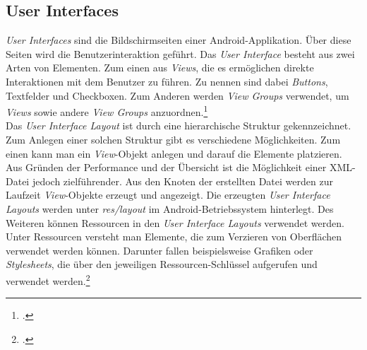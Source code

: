 \subsection{User Interfaces}
\label{ssec:android-ui}
\textit{User Interfaces} sind die Bildschirmseiten einer \gls{Android}-Applikation. Über diese Seiten wird die Benutzerinteraktion geführt. Das \textit{User Interface} besteht aus zwei Arten von Elementen. Zum einen aus \textit{Views}, die es ermöglichen direkte Interaktionen mit dem Benutzer zu führen. Zu nennen sind dabei \textit{Buttons}, Textfelder und Checkboxen. Zum Anderen werden \textit{View Groups} verwendet, um \textit{Views} sowie andere \textit{View Groups} anzuordnen.\footcite[S. 40f.]{Android-BeckerPant}\\
Das \textit{User Interface Layout} ist durch eine hierarchische Struktur gekennzeichnet. Zum Anlegen einer solchen Struktur gibt es verschiedene Möglichkeiten. Zum einen kann man ein \textit{View}-Objekt anlegen und darauf die Elemente platzieren. Aus Gründen der Performance und der Übersicht ist die Möglichkeit einer \ac{XML}-Datei jedoch zielführender. Aus den Knoten der erstellten Datei werden zur Laufzeit \textit{View}-Objekte erzeugt und angezeigt. Die erzeugten \textit{User Interface Layouts} werden unter \textit{res/layout} im \gls{Android}-Betriebssystem hinterlegt. Des Weiteren können Ressourcen in den \textit{User Interface Layouts} verwendet werden. Unter Ressourcen versteht man Elemente, die zum Verzieren von Oberflächen verwendet werden können. Darunter fallen beispielsweise Grafiken oder \textit{Stylesheets}, die über den jeweiligen Ressourcen-Schlüssel aufgerufen und verwendet werden.\footcite{Android-UI}

